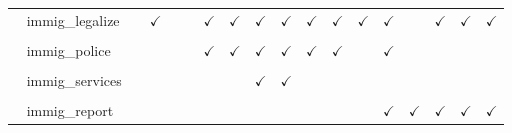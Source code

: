 \documentclass[
  12pt]{article}
\begin{document}
\begin{table}[H]
{\begin{tabular}{lcccccccccccccccc}
$\hspace{10pt}$immig\_legalize &  & $\checkmark$ &  &  & $\checkmark$ & $\checkmark$ & $\checkmark$ & $\checkmark$ & $\checkmark$ & $\checkmark$ & $\checkmark$ & $\checkmark$ &  & $\checkmark$ & $\checkmark$ & $\checkmark$\\
\cellcolor{gray!6}{$\hspace{10pt}$immig\_border} & \cellcolor{gray!6}{} & \cellcolor{gray!6}{$\checkmark$} & \cellcolor{gray!6}{} & \cellcolor{gray!6}{} & \cellcolor{gray!6}{$\checkmark$} & \cellcolor{gray!6}{$\checkmark$} & \cellcolor{gray!6}{$\checkmark$} & \cellcolor{gray!6}{$\checkmark$} & \cellcolor{gray!6}{$\checkmark$} & \cellcolor{gray!6}{$\checkmark$} & \cellcolor{gray!6}{$\checkmark$} & \cellcolor{gray!6}{$\checkmark$} & \cellcolor{gray!6}{} & \cellcolor{gray!6}{$\checkmark$} & \cellcolor{gray!6}{$\checkmark$} & \cellcolor{gray!6}{$\checkmark$}\\
$\hspace{10pt}$immig\_police &  &  &  &  & $\checkmark$ & $\checkmark$ & $\checkmark$ & $\checkmark$ & $\checkmark$ & $\checkmark$ &  & $\checkmark$ &  &  &  & \\
\cellcolor{gray!6}{$\hspace{10pt}$immig\_employer} & \cellcolor{gray!6}{} & \cellcolor{gray!6}{$\checkmark$} & \cellcolor{gray!6}{} & \cellcolor{gray!6}{} & \cellcolor{gray!6}{$\checkmark$} & \cellcolor{gray!6}{} & \cellcolor{gray!6}{$\checkmark$} & \cellcolor{gray!6}{$\checkmark$} & \cellcolor{gray!6}{$\checkmark$} & \cellcolor{gray!6}{$\checkmark$} & \cellcolor{gray!6}{$\checkmark$} & \cellcolor{gray!6}{$\checkmark$} & \cellcolor{gray!6}{} & \cellcolor{gray!6}{} & \cellcolor{gray!6}{} & \cellcolor{gray!6}{}\\
$\hspace{10pt}$immig\_services &  &  &  &  &  &  & $\checkmark$ & $\checkmark$ &  &  &  &  &  &  &  & \\
\cellcolor{gray!6}{$\hspace{10pt}$immig\_deport} & \cellcolor{gray!6}{} & \cellcolor{gray!6}{} & \cellcolor{gray!6}{} & \cellcolor{gray!6}{} & \cellcolor{gray!6}{} & \cellcolor{gray!6}{} & \cellcolor{gray!6}{} & \cellcolor{gray!6}{} & \cellcolor{gray!6}{$\checkmark$} & \cellcolor{gray!6}{$\checkmark$} & \cellcolor{gray!6}{$\checkmark$} & \cellcolor{gray!6}{$\checkmark$} & \cellcolor{gray!6}{} & \cellcolor{gray!6}{} & \cellcolor{gray!6}{} & \cellcolor{gray!6}{}\\
$\hspace{10pt}$immig\_report &  &  &  &  &  &  &  &  &  &  &  & $\checkmark$ & $\checkmark$ & $\checkmark$ & $\checkmark$ & $\checkmark$\\

\end{tabular}}
\end{table}
\end{document}
